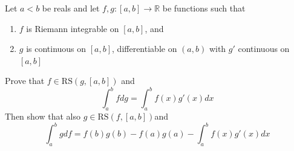 \documentclass[10pt,letterpaper]{article} %
\begin{document}
Let $a < b$ be reals and let $f, g: [a, b] \xrightarrow{} \mathbb{R}$ be functions such that
\begin{enumerate}
\item $f$ is Riemann integrable on $[a, b]$, and
\item $g$ is continuous on $[a, b]$, differentiable on $(a, b)$ with $g'$ continuous on $[a, b]$
\end{enumerate}
Prove that $f \in \text{RS}(g, [a, b])$ and
\begin{equation*}
\int_{a}^{b}fdg = \int_{a}^{b}f(x)g'(x)dx
\end{equation*}
Then show that also $g \in \text{RS}(f, [a, b])$and
\begin{equation*}
\int_{a}^{b}g df = f(b)g(b) - f(a)g(a) - \int_{a}^{b}f(x)g'(x)dx
\end{equation*}
\end{document}
